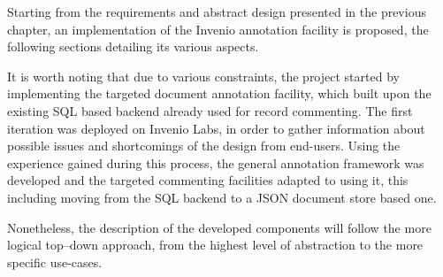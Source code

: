 
Starting from the requirements and abstract design presented in the previous
chapter, an implementation of the Invenio annotation facility is proposed,
the following sections detailing its various aspects.

It is worth noting that due to various constraints, the project started by
implementing the targeted document annotation facility, which built upon the
existing SQL based backend already used for record commenting. The first
iteration was deployed on Invenio Labs, in order to gather information about
possible issues and shortcomings of the design from end-users. Using the
experience gained during this process, the general annotation framework was
developed and the targeted commenting facilities adapted to using it, this
including moving from the SQL backend to a JSON document store based one.

Nonetheless, the description of the developed components will follow the more
logical top--down approach, from the highest level of abstraction to the more
specific use-cases.
